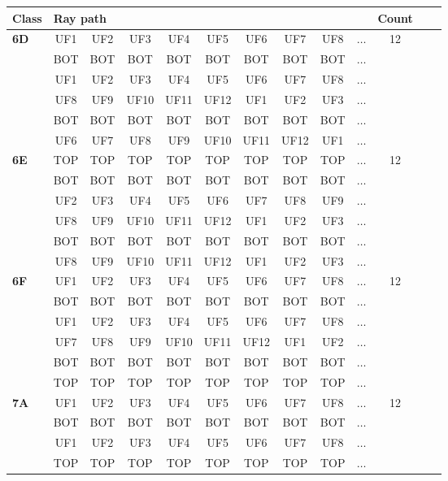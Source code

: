 \begin{table}[h!]
\centering
\begin{tabular}{|l|c|c|c|c|c|c|c|c|c|c|c|c|}
\hline
Class &  \multicolumn{9}{l}{Ray path} \vline  & Count\\
\hline \hline
\textbf{6D} & UF1 & UF2 & UF3 & UF4 & UF5 & UF6 & UF7 & UF8 & $\dots$ & 12\\
 & BOT & BOT & BOT & BOT & BOT & BOT & BOT & BOT & $\dots$ & \\
 & UF1 & UF2 & UF3 & UF4 & UF5 & UF6 & UF7 & UF8 & $\dots$ & \\
 & UF8 & UF9 & UF10 & UF11 & UF12 & UF1 & UF2 & UF3 & $\dots$ & \\
 & BOT & BOT & BOT & BOT & BOT & BOT & BOT & BOT & $\dots$ & \\
 & UF6 & UF7 & UF8 & UF9 & UF10 & UF11 & UF12 & UF1 & $\dots$ & \\
\hline \hline
\textbf{6E} & TOP & TOP & TOP & TOP & TOP & TOP & TOP & TOP & $\dots$ & 12\\
 & BOT & BOT & BOT & BOT & BOT & BOT & BOT & BOT & $\dots$ & \\
 & UF2 & UF3 & UF4 & UF5 & UF6 & UF7 & UF8 & UF9 & $\dots$ & \\
 & UF8 & UF9 & UF10 & UF11 & UF12 & UF1 & UF2 & UF3 & $\dots$ & \\
 & BOT & BOT & BOT & BOT & BOT & BOT & BOT & BOT & $\dots$ & \\
 & UF8 & UF9 & UF10 & UF11 & UF12 & UF1 & UF2 & UF3 & $\dots$ & \\
\hline \hline
\textbf{6F} & UF1 & UF2 & UF3 & UF4 & UF5 & UF6 & UF7 & UF8 & $\dots$ & 12\\
 & BOT & BOT & BOT & BOT & BOT & BOT & BOT & BOT & $\dots$ & \\
 & UF1 & UF2 & UF3 & UF4 & UF5 & UF6 & UF7 & UF8 & $\dots$ & \\
 & UF7 & UF8 & UF9 & UF10 & UF11 & UF12 & UF1 & UF2 & $\dots$ & \\
 & BOT & BOT & BOT & BOT & BOT & BOT & BOT & BOT & $\dots$ & \\
 & TOP & TOP & TOP & TOP & TOP & TOP & TOP & TOP & $\dots$ & \\
\hline \hline
\textbf{7A} & UF1 & UF2 & UF3 & UF4 & UF5 & UF6 & UF7 & UF8 & $\dots$ & 12\\
 & BOT & BOT & BOT & BOT & BOT & BOT & BOT & BOT & $\dots$ & \\
 & UF1 & UF2 & UF3 & UF4 & UF5 & UF6 & UF7 & UF8 & $\dots$ & \\
 & TOP & TOP & TOP & TOP & TOP & TOP & TOP & TOP & $\dots$ & \\

\end{tabular}
\end{table}
